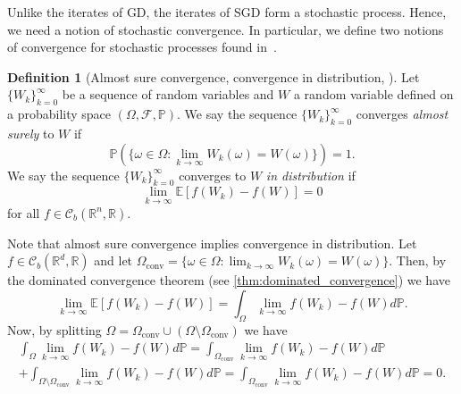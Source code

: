 \documentclass[12pt]{article}
\theoremstyle{definition}
\newtheorem{definition}[definition]{Definition}
\numberwithin{equation}{section}
\newcommand{\R}{\mathbb{R}}
\newcommand{\BP}{\mathbb{P}}
\newcommand{\CF}{\mathcal{F}}
\newcommand{\CC}{\mathcal{C}}
\newcommand{\ev}[1]{\mathbb{E}\left[{#1}\right]}
\begin{document}
Unlike the iterates of GD, the iterates of SGD form a stochastic process. Hence, we need a notion of stochastic convergence. In particular, we define two notions of convergence for stochastic processes found in~\autocite{eAppliedStochasticAnalysis2021}.

\begin{definition}[Almost sure convergence, convergence in distribution, ]
Let $\{W_k\}_{k=0}^{\infty}$ be a sequence of random variables and $W$ a random variable defined on a probability space $(\Omega, \CF, \BP)$. We say the sequence $\{W_k\}_{k=0}^{\infty}$ converges \emph{almost surely} to $W$ if
\begin{equation*}
  \BP(\{\omega \in \Omega : \lim_{k \rightarrow \infty}W_k(\omega) = W(\omega)\}) = 1.
\end{equation*}
We say the sequence  $\{W_k\}_{k=0}^{\infty}$ converges to $W$ \emph{in distribution} if
  \begin{equation*}
    \lim_{k \rightarrow \infty}\ev{f(W_k) - f(W)} = 0
  \end{equation*}
  for all $f \in \CC_b(\R^n, \R)$.
\end{definition}
Note that almost sure convergence implies convergence in distribution. Let $f \in \CC_b(\R^d, \R)$ and let $\Omega_{\text{conv}} = \{\omega \in \Omega : \lim_{k \rightarrow \infty}W_k(\omega) = W(\omega)\}$. Then, by the dominated convergence theorem (see \autoref{thm:dominated_convergence}) we have 
\begin{equation*}
  \lim_{k \rightarrow \infty} \ev{f(W_k) - f(W)} = \int_{\Omega} \lim_{k \rightarrow \infty} f(W_k) - f(W) d\BP.
\end{equation*}
Now, by splitting $\Omega = \Omega_{\text{conv}} \cup (\Omega \setminus \Omega_{\text{conv}})$ we have
\begin{multline*}
  \int_{\Omega} \lim_{k \rightarrow \infty} f(W_k) - f(W) d\BP 
  =\int_{\Omega_{\text{conv}}} \lim_{k \rightarrow \infty} f(W_k) - f(W) d\BP \\
   + \int_{\Omega \setminus \Omega_{\text{conv}}} \lim_{k \rightarrow \infty} f(W_k) - f(W) d\BP = \int_{\Omega_{\text{conv}}} \lim_{k \rightarrow \infty} f(W_k) - f(W) d\BP = 0.
\end{multline*}
\end{document}
